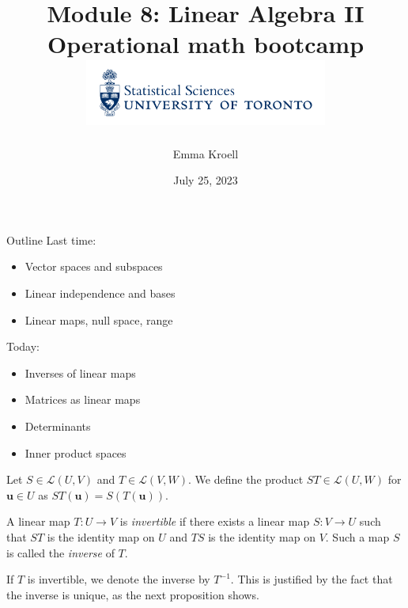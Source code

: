 \documentclass [aspectratio=169]{beamer}
\title[]{Module 8: Linear Algebra II \\ {\large Operational math bootcamp}\\ \includegraphics[width=8cm]{dept_logo.png}\vspace{-1em}}
\author[]{Emma Kroell}
\institute[]{University of Toronto}
\date{July 25, 2023}
\newcommand{\bu}{{\mathbf{u}}}
\newcommand{\cL}{{\mathcal{L}}}
\newcommand{\inv}{{-1}}
\begin{document}
{
\begin{frame}
    \titlepage
\end{frame}
}

\begin{frame}{Outline}
Last time:
    \begin{itemize}
      \setlength\itemsep{0.5em}
      \item Vector spaces and subspaces
    	\item Linear independence and bases
	\item Linear maps, null space, range
    \end{itemize}
    
\vspace{1em}

Today:
    \begin{itemize}
      \setlength\itemsep{0.5em}
      \item Inverses of linear maps
      	\item Matrices as linear maps
    	\item Determinants
	\item Inner product spaces
    \end{itemize}
\end{frame}

\begin{frame}
\begin{definition}
Let $S \in \cL(U,V)$ and $T \in \cL(V,W)$. We define the product $ST \in \cL(U,W)$ for $\bu\in U$ as $ST(\bu) = S(T(\bu))$.
\end{definition}

\vspace{1em}

\begin{definition}
A linear map $T: U \to V$ is \emph{invertible} if there exists a linear map $S: V \to U$ such that $ST$ is the identity map on $U$ and $TS$ is the identity map on $V$. Such a map $S$ is called the \emph{inverse} of $T$. 
\end{definition}

\vspace{1em}

If $T$ is invertible, we denote the inverse by $T^\inv$. This is justified by the fact that the inverse is unique, as the next proposition shows.

\end{frame}
\end{document}
